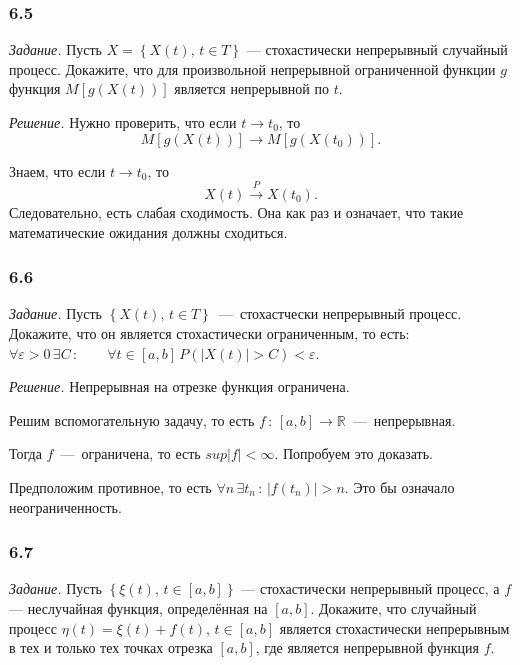 \subsubsection*{6.5}

\textit{Задание.}
Пусть $X = \left\{ X \left( t \right), \, t \in T \right\} $ ---
стохастически непрерывный случайный процесс.
Докажите, что для произвольной непрерывной ограниченной функции $g$ функция
$M \left[ g \left( X \left( t \right) \right) \right] $ является непрерывной по $t$.

\textit{Решение.}
Нужно проверить, что если $t \to t_0$, то
$$M \left[ g \left( X \left( t \right) \right) \right] \to
  M \left[ g \left( X \left( t_0 \right) \right) \right].$$

Знаем, что если $t \to t_0$, то
$$X \left( t \right) \overset{P}{ \to }
  X \left( t_0 \right).$$
Следовательно, есть слабая сходимость.
Она как раз и означает, что такие математические ожидания должны сходиться.

\subsubsection*{6.6}

\textit{Задание.}
Пусть $ \left\{ X \left( t \right), \, t \in T \right\} $~---~стохастчески непрерывный процесс.
Докажите, что он является стохастически ограниченным, то есть:
$ \forall \varepsilon > 0 \, \exists C \, : \qquad \forall t \in \left[ a, b \right] \,
  P \left( \left| X \left( t \right) \right| > C \right) < \varepsilon $.

\textit{Решение.}
Непрерывная на отрезке функция ограничена.

Решим вспомогательную задачу,
то есть $f \, : \, \left[ a, b \right] \to \mathbb{R}$~---~непрерывная.

Тогда $f$~---~ограничена, то есть $sup \left| f \right| < \infty $.
Попробуем это доказать.

Предположим противное,
то есть $ \forall n \, \exists t_n \, : \, \left| f \left( t_n \right) \right| > n$.
Это бы означало неограниченность.

\subsubsection*{6.7}

\textit{Задание.}
Пусть $ \left\{ \xi \left( t \right), \, t \in \left[ a, b \right] \right\} $ ---
стохастически непрерывный процесс, а $f$ --- неслучайная функция,
определённая на $ \left[ a, b \right] $.
Докажите, что случайный процесс
$ \eta \left( t \right) =
  \xi \left( t \right) + f \left( t \right), \, t \in \left[ a, b \right] $
является стохастически непрерывным в тех и только тех точках отрезка $ \left[ a, b \right] $,
где является непрерывной функция $f$.

